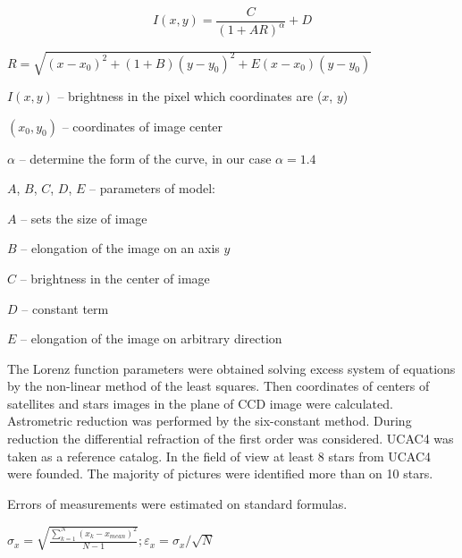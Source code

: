\documentclass[]{article}
\begin{document}
\begin{equation}
\label{1}
I(x,y) = \frac{C}{(1 + AR)^{\alpha}} + D
\end{equation}
\begin{center}
\begin{math}
R = \sqrt{(x-x_0)^2 + (1+B)(y-y_0)^2 +E(x-x_0)(y-y_0)}
\end{math}\\
\end{center}
$I(x,y)$ -- brightness in the pixel which coordinates are ($x$, $y$)\par
$(x_0, y_0)$ -- coordinates of image center\par
$\alpha$ --  determine the form of the curve, in our case $\alpha = 1.4$\par
$A$, $B$, $C$, $D$, $E$ -- parameters of model:\par
$A$ -- sets the size of image\par
$B$ -- elongation of the image on an axis $y$\par
$C$ -- brightness in the center of image\par
$D$ -- constant term\par
$E$ -- elongation of the image on arbitrary direction\par
\vskip0.1cm

The Lorenz function parameters were obtained  solving excess system of equations by the non-linear method of the least squares. Then coordinates of centers of satellites and stars images in the plane of CCD image were calculated. Astrometric reduction was performed by the six-constant method. During reduction the differential refraction of the first order was considered. UCAC4 \cite{9} was taken as a reference catalog. In the field of view at least 8 stars from UCAC4 were founded. The majority of pictures were identified more than on 10 stars. \par
Errors of measurements were estimated on standard formulas.

\begin{math}
\sigma_x = \sqrt{\frac{\sum\limits_{k=1}^{N}(x_k-x_{mean})^2}{N-1}}; \varepsilon_x = \sigma_x/\sqrt{N}
\end{math}\\
\end{document}

